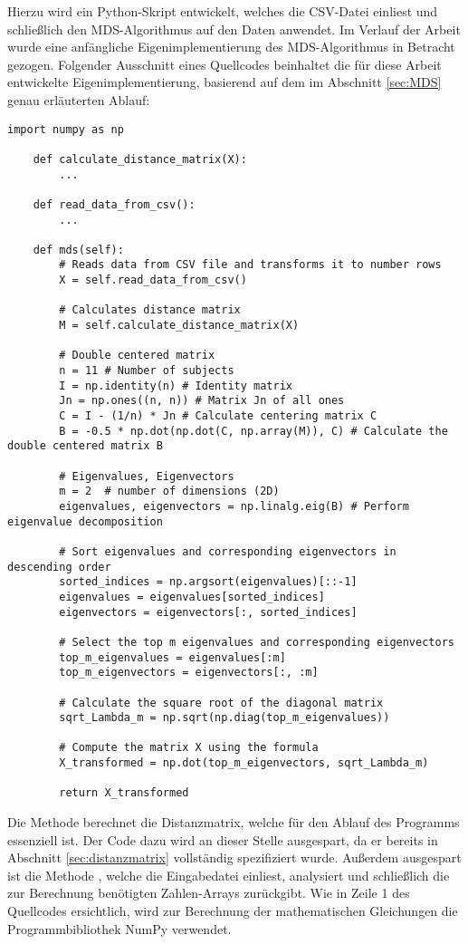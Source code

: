 Hierzu wird ein Python-Skript entwickelt, welches die CSV-Datei einliest und
schließlich den MDS-Algorithmus auf den Daten anwendet. Im Verlauf der
Arbeit wurde eine anfängliche Eigenimplementierung des MDS-Algorithmus in
Betracht gezogen. Folgender Ausschnitt eines Quellcodes beinhaltet die für diese
Arbeit entwickelte Eigenimplementierung, basierend auf dem im Abschnitt
\ref{sec:MDS} genau erläuterten Ablauf:

\begin{lstlisting}[style=Python]
    import numpy as np

    def calculate_distance_matrix(X):
        ...

    def read_data_from_csv():
        ...

    def mds(self):
        # Reads data from CSV file and transforms it to number rows
        X = self.read_data_from_csv()

        # Calculates distance matrix
        M = self.calculate_distance_matrix(X)

        # Double centered matrix
        n = 11 # Number of subjects
        I = np.identity(n) # Identity matrix
        Jn = np.ones((n, n)) # Matrix Jn of all ones
        C = I - (1/n) * Jn # Calculate centering matrix C
        B = -0.5 * np.dot(np.dot(C, np.array(M)), C) # Calculate the double centered matrix B

        # Eigenvalues, Eigenvectors
        m = 2  # number of dimensions (2D)
        eigenvalues, eigenvectors = np.linalg.eig(B) # Perform eigenvalue decomposition

        # Sort eigenvalues and corresponding eigenvectors in descending order
        sorted_indices = np.argsort(eigenvalues)[::-1]
        eigenvalues = eigenvalues[sorted_indices]
        eigenvectors = eigenvectors[:, sorted_indices]

        # Select the top m eigenvalues and corresponding eigenvectors
        top_m_eigenvalues = eigenvalues[:m]
        top_m_eigenvectors = eigenvectors[:, :m]

        # Calculate the square root of the diagonal matrix
        sqrt_Lambda_m = np.sqrt(np.diag(top_m_eigenvalues))

        # Compute the matrix X using the formula
        X_transformed = np.dot(top_m_eigenvectors, sqrt_Lambda_m)

        return X_transformed
\end{lstlisting}

Die Methode  berechnet die Distanzmatrix,
welche für den Ablauf des Programms essenziell ist. Der Code dazu wird an
dieser Stelle ausgespart, da er bereits in Abschnitt \ref{sec:distanzmatrix}
vollständig spezifiziert wurde. Außerdem ausgespart ist die Methode
, welche die Eingabedatei einliest, analysiert und
schließlich die zur Berechnung benötigten Zahlen-Arrays zurückgibt. Wie in Zeile
1 des Quellcodes ersichtlich, wird zur Berechnung der mathematischen Gleichungen
die Programmbibliothek NumPy verwendet. \parencite{team_numpy_2023}

